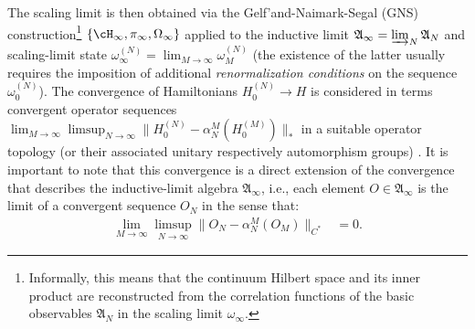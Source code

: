 \documentclass[a4paper, 11pt]{article}
\newcommand{\fA}{\mathfrak{A}}\newcommand{\cA}{\mathcal{A}}\newcommand{\dA}{\mathds{A}}\newcommand{\sA}{\mathscr{A}}
\DeclareMathOperator{\1}{\mathds{1}}
\begin{document}
The scaling limit is then obtained via the Gelf'and-Naimark-Segal (GNS) construction\footnote{Informally, this means that the continuum Hilbert space and its inner product are reconstructed from the correlation functions of the basic observables $\fA_{N}$ in the scaling limit $\omega_{\infty}$.} $\{\cH_{\infty}, \pi_{\infty}, \Omega_{\infty}\}$ applied to the inductive limit $\fA_{\infty} = \varinjlim_{N}\fA_{N}$ and scaling-limit state $\omega^{(N)}_{\infty} = \lim_{M\rightarrow\infty}\omega^{(N)}_{M}$ (the existence of the latter usually requires the imposition of additional \emph{renormalization conditions} on the sequence $\omega^{(N)}_{0}$). The convergence of Hamiltonians $H^{(N)}_{0}\rightarrow H$ is considered in terms convergent operator sequences $\lim_{M\rightarrow\infty}\limsup_{N\rightarrow\infty}\|H^{(N)}_{0}-\alpha^{M}_{N}(H^{(M)}_{0})\|_{*}$ in a suitable operator topology (or their associated unitary respectively automorphism groups) \cite{DuffieldMeanFieldDynamical}. It is important to note that this convergence is a direct extension of the convergence that describes the inductive-limit algebra $\fA_{\infty}$, i.e., each element $O\in\fA_{\infty}$ is the limit of a convergent sequence $O_{N}$ in the sense that:
\begin{align*}
\lim_{M\rightarrow\infty}\limsup_{N\rightarrow\infty}\|O_{N}-\alpha^{M}_{N}(O_{M})\|_{C^{*}} & = 0.
\end{align*}
\end{document}
